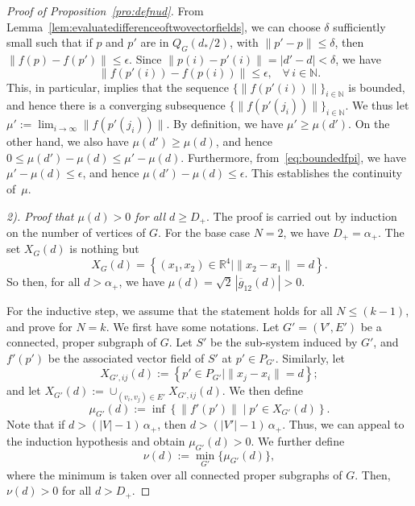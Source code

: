 \documentclass[10pt,twocolumn,twoside]{IEEEtran}
\newcommand{\R}{\mathbb{R}}
\newcommand{\ol}{\overline}
\renewcommand{\(}{\left (}
\renewcommand{\)}{\right )}
\renewcommand{\;}{\,;\,}
\newcommand{\N}{\mathbb{N}}
\begin{document}
\begin{proof}[Proof of Proposition~\ref{pro:defnud}]
From Lemma~\ref{lem:evaluatedifferenceoftwovectorfields}, we can choose 
 $\delta$ sufficiently small such that if $p$ and $p'$ are in $Q_G(d_*/2)$, with $\|p' - p\| \le \delta$, then $\|f(p) - f(p')\| \le \epsilon$. Since $\|p(i) - p'(i)\| = |d' - d| < \delta$, we have 
\begin{equation}\label{eq:boundedfpi}
\| f(p'(i)) - f(p(i)) \| \le \epsilon, \hspace{10pt} \forall\, i\in \N.
\end{equation}
This, in particular, implies that the sequence $\{\| f(p'(i)) \|\}_{i\in \N}$ is bounded, and hence there is a converging subsequence  $\{\|f(p'(j_i))\|\}_{i\in\N}$. We thus let 
$
\mu':= \lim_{i\to \infty} \| f(p'(j_i)) \| 
$. By definition, we have $\mu' \ge \mu(d')$. On the other hand, we also have $\mu(d') \ge \mu(d)$, and hence 
$
0\le \mu(d') - \mu(d) \le \mu' - \mu(d)
$. 
Furthermore, from~\eqref{eq:boundedfpi}, we have 
$
\mu' - \mu(d) \le \epsilon 
$, and hence $\mu(d') - \mu(d) \le \epsilon$.  
This establishes the continuity of~$\mu$. 

\vspace{3pt}
\noindent
{\it 2). Proof that $\mu(d) > 0$ for all $d\ge D_+$}.
The proof is carried out by induction on the number of vertices of $G$. For the base case $N = 2$, we have $D_+ = \alpha_+$. The set $X_G(d)$ is nothing but
$$
X_G(d) = \left \{  (x_1, x_2)\in \R^4  \mid \|x_2 - x_1\| = d \right \}.
$$
So then, for all $d > \alpha_+$, we have $\mu(d) = \sqrt{2} \, | \ol g_{12}(d) | > 0$. 

For the inductive step, we assume that the statement holds for all $N \le (k-1)$, and prove for $N = k$.  We first have some notations. 
Let $G' = (V', E')$ be a connected, proper subgraph of $G$. Let $S'$ be the sub-system induced by $G'$, and $f'(p')$ be the associated vector field of $S'$ at $p'\in P_{G'}$. 
Similarly, let 
$$
X_{G', ij}(d) := \left\{ p'\in P_{G'} \mid  \|x_{j} - x_{i}\| = d \right\};
$$
and let $X_{G'}(d) := \cup_{(v_i,v_j)\in E'} X_{G', ij}(d)$.  We then define
$$
\mu_{G'}(d) := \inf\left\{ \|f'(p')\| \mid p' \in X_{G'}(d) \right\}.
$$
Note that if $d > (|V| -1) \, \alpha_+$, then   
$
d > (|V'| - 1) \, \alpha_+
$.  Thus, we can appeal to the induction hypothesis and obtain $\mu_{G'}(d) > 0$. We further define   
$$
\nu(d) := \min_{G'}\{ \mu_{G'}(d) \}, 
$$ 
where the minimum is taken over all  connected proper subgraphs of $G$. Then, $\nu(d) > 0$ for all $d > D_+ $.


\end{proof}
\end{document}

